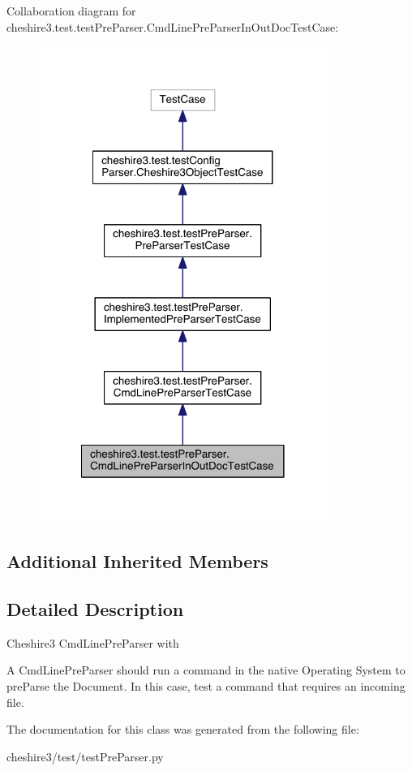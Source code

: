 Collaboration diagram for cheshire3.\-test.\-test\-Pre\-Parser.\-Cmd\-Line\-Pre\-Parser\-In\-Out\-Doc\-Test\-Case\-:
\nopagebreak
\begin{figure}[H]
\begin{center}
\leavevmode
\includegraphics[width=266pt]{classcheshire3_1_1test_1_1test_pre_parser_1_1_cmd_line_pre_parser_in_out_doc_test_case__coll__graph}
\end{center}
\end{figure}
\subsection*{Additional Inherited Members}


\subsection{Detailed Description}
\begin{DoxyVerb}Cheshire3 CmdLinePreParser with %

A CmdLinePreParser should run a command in the native Operating System to
preParse the Document. In this case, test a command that requires an 
incoming file.
\end{DoxyVerb}
 

The documentation for this class was generated from the following file\-:\begin{DoxyCompactItemize}
\item 
cheshire3/test/test\-Pre\-Parser.\-py\end{DoxyCompactItemize}
